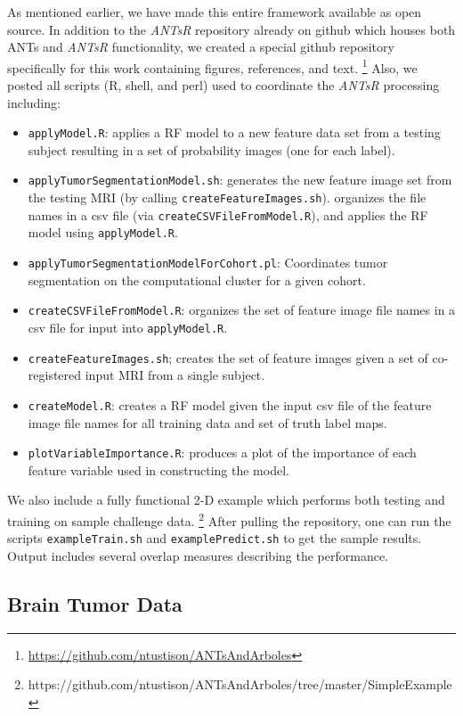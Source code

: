 \documentclass[preprint,authoryear,review,12pt]{elsarticle}
\begin{document}
As mentioned earlier, we have made this entire framework
available as open source.  In addition to the \textit{ANTsR} repository
already on github which houses both ANTs and \textit{ANTsR} functionality, 
we created a special github repository specifically for this work
containing figures, references, and text.%
\footnote{
\href{https://github.com/ntustison/ANTsAndArboles}{https://github.com/ntustison/ANTsAndArboles}
}
Also, we posted all
scripts (R, shell, and perl) used to coordinate the \textit{ANTsR} processing 
including:
\begin{itemize}
  \item {\tt applyModel.R}:  applies a RF model to a new 
  feature data set from a testing subject resulting in a set of probability
  images (one for each label).
  \item {\tt applyTumorSegmentationModel.sh}:  generates the new feature image set 
  from the testing MRI (by calling {\tt createFeatureImages.sh}).
  organizes the file names in a csv file (via {\tt createCSVFileFromModel.R}),
  and applies the RF model using {\tt applyModel.R}. 
  \item {\tt applyTumorSegmentationModelForCohort.pl}:  Coordinates tumor 
  segmentation on the computational cluster for a given cohort.
  \item {\tt createCSVFileFromModel.R}:  organizes the set of feature image
  file names in a csv file for input into {\tt applyModel.R}.
  \item {\tt createFeatureImages.sh};  creates the set of feature images given
  a set of co-registered input MRI from a single subject. 
  \item {\tt createModel.R}:  creates a RF model given the input csv 
  file of the feature image file names for all training data and set of truth
  label maps.
  \item {\tt plotVariableImportance.R}:  produces a plot of the importance 
   of each feature variable used 
  in constructing the model.
\end{itemize}
We also include a fully functional 2-D example which performs
both testing and training on sample challenge data.%
\footnote{
https://github.com/ntustison/ANTsAndArboles/tree/master/SimpleExample
}
After pulling the repository, one can run the scripts {\tt exampleTrain.sh}
and {\tt examplePredict.sh} to get the sample results.  Output includes
several overlap measures describing the performance.

\subsection{Brain Tumor Data}
\end{document}

